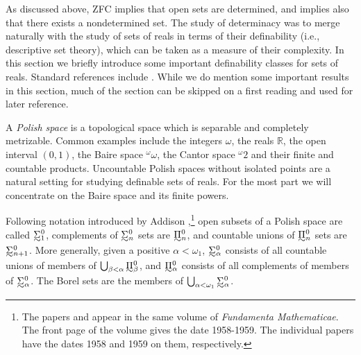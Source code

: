 \documentclass{book}%
\newcommand{\breals}{{^{\omega}}\omega}
\newcommand{\creals}{{^{\omega}}2}
\def\underTilde#1{{\baselineskip=0pt\vtop{\hbox{$#1$}\hbox{$\sim$}}}{}}
\newcommand{\uTPi}{\underTilde{\Pi}}
\newcommand{\uTSigma}{\underTilde{\Sigma}}
\begin{document}
As discussed above, ZFC implies that open sets are determined, and implies also that there exists a nondetermined set. The study of determinacy
was to merge naturally with the study of sets of reals in terms of their definability (i.e., descriptive set theory), which can be taken
as a measure of their complexity. In this section we briefly introduce some important definability classes for sets of reals. Standard references
include \cite{Moschovakis:DST, Kechris:CDST}. While we do mention some important results in this section, much of the section can be skipped on a first reading and used for later reference.

A \emph{Polish space} is a topological space which is separable and completely metrizable. Common examples include the integers $\omega$,
the reals $\mathbb{R}$, the open interval $(0,1)$, the Baire space $\breals$, the Cantor
space $\creals$ and their finite and countable products. Uncountable Polish spaces without isolated points are a natural setting
for studying definable sets of reals. For the most part we will concentrate on the Baire space and its finite powers.

Following notation introduced by Addison
,\footnote{The papers \cite{Addison:1958} and
\cite{Addison:1959} appear in the same volume of \emph{Fundamenta
Mathematicae}. The front page of the volume gives the date 1958-1959.
The individual papers have the dates 1958 and 1959 on them,
respectively.}
open subsets of a Polish space are called
$\uTSigma^{0}_{1}$, complements of
$\uTSigma^{0}_{n}$%
sets are $\uTPi^{0}_{n}$, and countable unions of
$\uTPi^{0}_{n}$ sets are $\uTSigma^{0}_{n+1}$. More generally, given
a positive $\alpha < \omega_{1}$, $\uTSigma^{0}_{\alpha}$ consists of all
countable unions of members of $\bigcup_{\beta < \alpha}\uTPi^{0}_{\beta}$, and
$\uTPi^{0}_{\alpha}$ consists of all complements of members of $\uTSigma^{0}_{\alpha}$.
The Borel sets are the members of
$\bigcup_{\alpha <\omega_{1}}\uTSigma^{0}_{\alpha}$.
\end{document}
